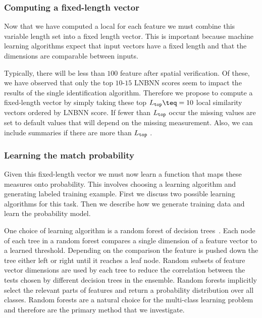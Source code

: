         \subsubsection{Computing a fixed-length vector}
            Now that we have computed a local \matchvec{} for each feature
              \correspondence{} we must combine this variable length set into a
              fixed length vector.
            This is important because machine learning algorithms expect that
              input vectors have a fixed length and that the dimensions are
              comparable between inputs.

            \newcommand{\Ltop}{L_{\tt{top}}}

            Typically, there will be less than $100$ feature
              \correspondences{} after spatial verification.
            Of these, we have observed that only the top $10$-$15$ LNBNN
              scores seem to impact the results of the single \annot{}
              identification algorithm.
            Therefore we propose to compute a fixed-length vector by simply
              taking these top $\Ltop\teq=10$ local similarity vectors ordered
              by LNBNN score.
            If fewer than $\Ltop$ \correspondences{} occur the missing values
              are set to default values that will depend on the missing
              measurement.
            Also, we can include summaries if there are more than $\Ltop$
              \correspondences{}.

        \subsubsection{Learning the match probability}

            Given this fixed-length vector we must now learn a function that
              maps these measures onto probability.
            This involves choosing a learning algorithm and generating labeled
              training example.
            First we discuss two possible learning algorithms for this task.
            Then we describe how we generate training data and learn the
              probability model.

            One choice of learning algorithm is a random forest of decision
              trees~\cite{ho_random_1995,amit_shape_1997,breiman_random_2001}.
            Each node of each tree in a random forest compares a single
              dimension of a feature vector to a learned threshold.
            Depending on the comparison the feature is pushed down the tree
              either left or right until it reaches a leaf node.
            Random subsets of feature vector dimensions are used by each tree
              to reduce the correlation between the tests chosen by different
              decision trees in the ensemble.
            Random forests implicitly select the relevant parts of features
              and return a probability distribution over all classes.
            Random forests are a natural choice for the multi-class learning
              problem and therefore are the primary method that we investigate.

